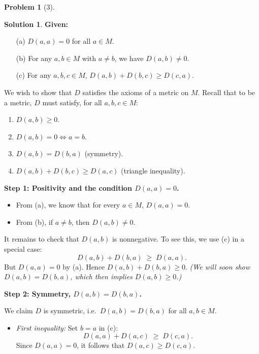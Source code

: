 \documentclass[12pt]{article}
\theoremstyle{definition} %
\newtheorem{solution}{Solution}
\newtheorem{problem}{Problem}
\theoremstyle{plain} %
\begin{document}
\begin{problem}[3]
    
\end{problem}
\begin{solution}

\textbf{Given:} 
\begin{itemize}
    \item[(a)] $D(a,a) = 0$ for all $a \in M$.
    \item[(b)] For any $a,b \in M$ with $a \neq b$, we have $D(a,b) \neq 0$.
    \item[(c)] For any $a,b,c \in M$, $D(a,b) + D(b,c) \geq D(c,a)$.
\end{itemize}

We wish to show that $D$ satisfies the axioms of a metric on $M$. Recall that to be a metric, $D$ must satisfy, for all $a,b,c \in M$:

\begin{enumerate}
    \item $D(a,b) \geq 0$.
    \item $D(a,b) = 0 \iff a = b$.
    \item $D(a,b) = D(b,a)$ (symmetry).
    \item $D(a,b) + D(b,c) \geq D(a,c)$ (triangle inequality).
\end{enumerate}

\medskip

\noindent \textbf{Step 1: Positivity and the condition $D(a,a)=0$.}

\begin{itemize}
    \item From (a), we know that for every $a \in M$, $D(a,a) = 0$.
    \item From (b), if $a \neq b$, then $D(a,b) \neq 0$. 
\end{itemize}
It remains to check that $D(a,b)$ is nonnegative. To see this, we use (c) in a special case:
\[
    D(a,b) + D(b,a) \;\ge\; D(a,a).
\]
But $D(a,a) = 0$ by (a). Hence $D(a,b) + D(b,a) \ge 0$. 
\emph{(We will soon show $D(a,b) = D(b,a)$, which then implies $D(a,b) \ge 0$.)}

\medskip

\noindent \textbf{Step 2: Symmetry, $D(a,b) = D(b,a)$.}

We claim $D$ is symmetric, i.e.\ $D(a,b) = D(b,a)$ for all $a,b \in M$. 

\begin{itemize}
    \item \emph{First inequality:} Set $b = a$ in (c):
    \[
        D(a,a) + D(a,c) \;\ge\; D(c,a).
    \]
    Since $D(a,a) = 0$, it follows that $D(a,c) \ge D(c,a)$.


\end{itemize}
\end{solution}
\end{document}
